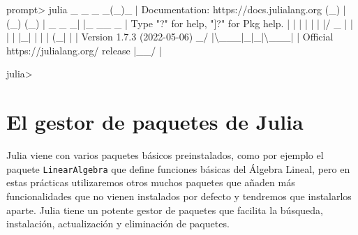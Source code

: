 \documentclass[
  a4paper,
]{scrreport}
\newenvironment{Shaded}{\begin{snugshade}}{\end{snugshade}}
\newcommand{\BuiltInTok}[1]{\textcolor[rgb]{0.00,0.23,0.31}{#1}}
\newcommand{\ControlFlowTok}[1]{\textcolor[rgb]{0.00,0.23,0.31}{#1}}
\newcommand{\DataTypeTok}[1]{\textcolor[rgb]{0.68,0.00,0.00}{#1}}
\newcommand{\FloatTok}[1]{\textcolor[rgb]{0.68,0.00,0.00}{#1}}
\newcommand{\FunctionTok}[1]{\textcolor[rgb]{0.28,0.35,0.67}{#1}}
\newcommand{\NormalTok}[1]{\textcolor[rgb]{0.00,0.23,0.31}{#1}}
\newcommand{\OperatorTok}[1]{\textcolor[rgb]{0.37,0.37,0.37}{#1}}
\newcommand{\SpecialStringTok}[1]{\textcolor[rgb]{0.13,0.47,0.30}{#1}}
\newcommand{\StringTok}[1]{\textcolor[rgb]{0.13,0.47,0.30}{#1}}
\theoremstyle{definition}
\theoremstyle{remark}
\begin{document}
\begin{Shaded}
\begin{Highlighting}[]
\NormalTok{prompt}\OperatorTok{\textgreater{}}\NormalTok{ julia}
\NormalTok{               \_}
\NormalTok{   \_       \_ }\FunctionTok{\_}\NormalTok{(\_)\_     }\OperatorTok{|}\NormalTok{  Documentation}\OperatorTok{:}\NormalTok{ https}\OperatorTok{://}\NormalTok{docs.julialang.org}
\NormalTok{  (\_)     }\OperatorTok{|}\NormalTok{ (\_) (\_)    }\OperatorTok{|}
\NormalTok{   \_ \_   \_}\OperatorTok{|} \OperatorTok{|}\NormalTok{\_  \_\_ \_   }\OperatorTok{|}  \DataTypeTok{Type} \StringTok{"?"} \ControlFlowTok{for}\NormalTok{ help, }\StringTok{"]?"} \ControlFlowTok{for} \BuiltInTok{Pkg}\NormalTok{ help.}
  \OperatorTok{|} \OperatorTok{|} \OperatorTok{|} \OperatorTok{|} \OperatorTok{|} \OperatorTok{|} \OperatorTok{|/}\NormalTok{ \_}\SpecialStringTok{\textasciigrave{} |  |}
  \OperatorTok{|} \OperatorTok{|} \OperatorTok{|}\NormalTok{\_}\OperatorTok{|} \OperatorTok{|} \OperatorTok{|} \OperatorTok{|}\NormalTok{ (\_}\OperatorTok{|} \OperatorTok{|}  \OperatorTok{|}\NormalTok{  Version }\FloatTok{1.7.3}\NormalTok{ (}\FloatTok{2022}\OperatorTok{{-}}\FloatTok{05}\OperatorTok{{-}}\FloatTok{06}\NormalTok{)}
\NormalTok{ \_}\OperatorTok{/} \OperatorTok{|\textbackslash{}}\NormalTok{\_\_}\OperatorTok{\textquotesingle{}}\NormalTok{\_}\OperatorTok{|}\NormalTok{\_}\OperatorTok{|}\NormalTok{\_}\OperatorTok{|\textbackslash{}}\NormalTok{\_\_}\OperatorTok{\textquotesingle{}}\NormalTok{\_}\OperatorTok{|}  \OperatorTok{|}\NormalTok{  Official https}\OperatorTok{://}\NormalTok{julialang.org}\OperatorTok{/}\NormalTok{ release}
\OperatorTok{|}\NormalTok{\_\_}\OperatorTok{/}                   \OperatorTok{|}

\NormalTok{julia}\OperatorTok{\textgreater{}}
\end{Highlighting}
\end{Shaded}

\section{El gestor de paquetes de
Julia}\label{el-gestor-de-paquetes-de-julia}

Julia viene con varios paquetes básicos preinstalados, como por ejemplo
el paquete \texttt{LinearAlgebra} que define funciones básicas del
Álgebra Lineal, pero en estas prácticas utilizaremos otros muchos
paquetes que añaden más funcionalidades que no vienen instalados por
defecto y tendremos que instalarlos aparte. Julia tiene un potente
gestor de paquetes que facilita la búsqueda, instalación, actualización
y eliminación de paquetes.
\end{document}
